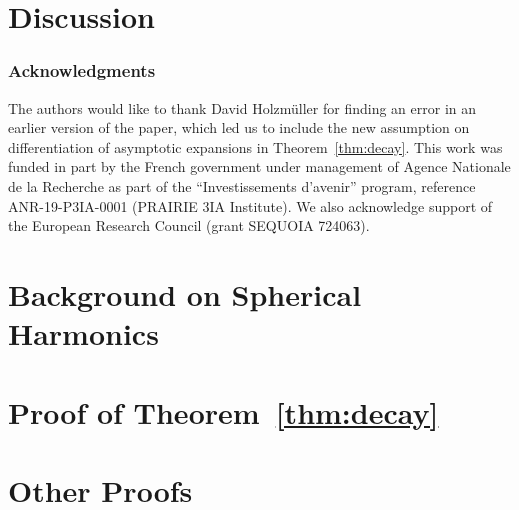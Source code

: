 \documentclass{article}
\begin{document}
\section{Discussion}



\subsubsection*{Acknowledgments}
The authors would like to thank David Holzmüller for finding an error in an earlier version of the paper, which led us to include the new assumption on differentiation of asymptotic expansions in Theorem~\ref{thm:decay}.
This work was funded in part by the French government under management of Agence Nationale
de la Recherche as part of the ``Investissements d’avenir'' program, reference ANR-19-P3IA-0001
(PRAIRIE 3IA Institute). We also acknowledge support of the European Research Council (grant
SEQUOIA 724063).




\appendix
\section{Background on Spherical Harmonics}
\label{sec:appx_background}


\section{Proof of Theorem~\ref{thm:decay}}
\label{sec:appx_thm_proof}


\section{Other Proofs}
\label{sec:appx_proofs}

\end{document}
